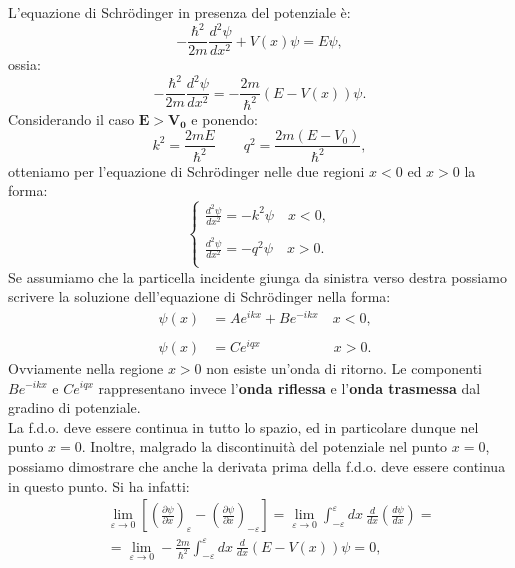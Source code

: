 \documentclass[a4paper,11pt,oneside]{book}
\begin{document}
L'equazione di Schr\"{o}dinger in presenza del potenziale è:
\begin{equation}
-\frac{\hbar ^2}{2m}\frac{d^2 \psi}{dx^2}+ V(x)\psi= E\psi, 
\end{equation}
ossia:
\begin{equation}
-\frac{\hbar ^2}{2m}\frac{d^2 \psi}{dx^2}= -\frac{2m}{\hbar ^2}\left( E-V(x)\right) \psi. 
\end{equation}
Considerando il caso $\mathbf{E>V_0}$ e ponendo:
\begin{equation}
k^2=\frac{2mE}{\hbar ^2} \qquad q^2=\frac{2m\left( E- V_0\right)}{\hbar ^2},
\end{equation}
otteniamo per l'equazione di Schr\"{o}dinger nelle due regioni $x<0$ ed $x>0$ la forma:
\begin{equation}
\begin{cases}
\displaystyle{\frac{d^2 \psi}{dx^2}= -k^2 \psi \quad x<0,}\\
\\
\displaystyle{\frac{d^2 \psi}{dx^2}= -q^2 \psi \quad x>0.}\\
\end{cases}
\end{equation}
Se assumiamo che la particella incidente giunga da sinistra verso destra possiamo scrivere la soluzione dell'equazione di Schr\"{o}dinger nella forma:
\begin{eqnarray}
&\psi(x)& = Ae^{ikx}+Be^{-ikx} \quad x<0,\nonumber\\
\\
&\psi(x)& = Ce^{iqx} \qquad \ \quad \qquad x>0.\nonumber
\end{eqnarray}
Ovviamente nella regione $x>0$ non esiste un'onda di ritorno. Le componenti $\displaystyle{Be^{-ikx}}$ e $\displaystyle{Ce^{iqx}}$ rappresentano invece l'\textbf{onda riflessa} e l'\textbf{onda trasmessa} dal gradino di potenziale.\\
La f.d.o. deve essere continua in tutto lo spazio, ed in particolare dunque nel punto $x=0$. Inoltre, malgrado la discontinuità del potenziale nel punto $x=0$, possiamo dimostrare che anche la derivata prima della f.d.o. deve essere continua in questo punto. Si ha infatti:
\begin{eqnarray}
& &\lim _{\varepsilon \rightarrow 0 } \left[ \left( \frac{\partial \psi}{\partial x}\right) _{\varepsilon}-\left( \frac{\partial \psi}{\partial x}\right)_{-\varepsilon}\right]=\lim _{\varepsilon \rightarrow 0 } \int_{-\varepsilon} ^{\varepsilon} dx\ \frac{d}{dx} \left( \frac{d\psi}{dx}\right)= \nonumber \\
& & = \lim _{\varepsilon \rightarrow 0 } -\frac{2m}{\hbar ^2}\int_{-\varepsilon} ^{\varepsilon} dx\ \frac{d}{dx} \left(E-V(x) \right)\psi=0,
\end{eqnarray}
\end{document}
